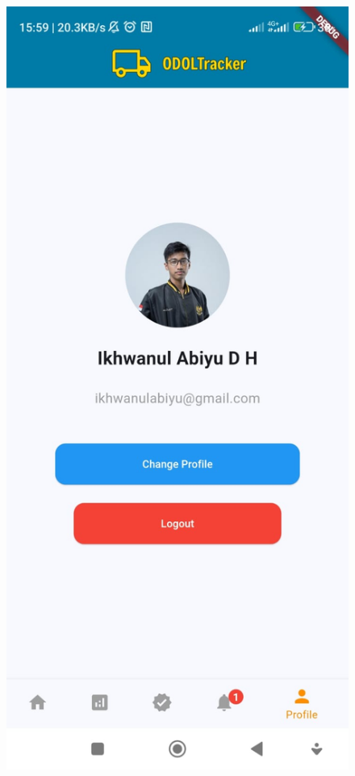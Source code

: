 \begin{figure}[htbp]
  \centering
  \includegraphics[scale=0.2]{gambar/bab3-profile.jpeg}

\end{figure}
